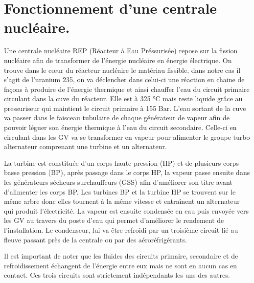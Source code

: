 \section{Fonctionnement d'une centrale nucléaire.}

Une centrale nucléaire REP (Réacteur à Eau Préssurisée) repose sur la fission nucléaire afin de transformer de l’énergie nucléaire en énergie électrique. On trouve dans le cœur du réacteur nucléaire le matériau fissible, dans notre cas il s’agit de l’uranium 235, on va déclencher dans celui-ci une réaction en chaine de façons à produire de l’énergie thermique et ainsi chauffer l’eau du circuit primaire circulant dans la cuve du réacteur. Elle est à 325 °C mais reste liquide grâce au pressuriseur qui maintient le circuit primaire à 155 Bar. L’eau sortant de la cuve va passer dans le faisceau tubulaire de chaque générateur de vapeur afin de pouvoir léguer son énergie thermique à l’eau du circuit secondaire. Celle-ci en circulant dans les GV va se transformer en vapeur pour alimenter le groupe turbo alternateur comprenant une turbine et un alternateur.

La turbine est constituée d'un corps haute pression (HP) et de plusieurs corps basse pression (BP), après passage dans le corps HP, la vapeur passe ensuite dans les générateurs sécheurs surchauffeurs (GSS) afin d’améliorer son titre avant d'alimenter les corps BP. Les turbines BP et la turbine HP se trouvent sur le même arbre donc elles tournent à la même vitesse et entraînent un alternateur qui produit l'électricité. La vapeur est ensuite condensée en eau puis envoyée vers les GV au travers du poste d'eau qui permet d'améliorer le rendement de l'installation. Le condenseur, lui va être refroidi par un troisième circuit lié au fleuve passant près de la centrale ou par des aéroréfrigérants.

Il est important de noter que les fluides des circuits primaire, secondaire et de refroidissement échangent de l’énergie entre eux mais ne sont en aucun cas en contact. Ces trois circuits sont strictement indépendants les uns des autres.


